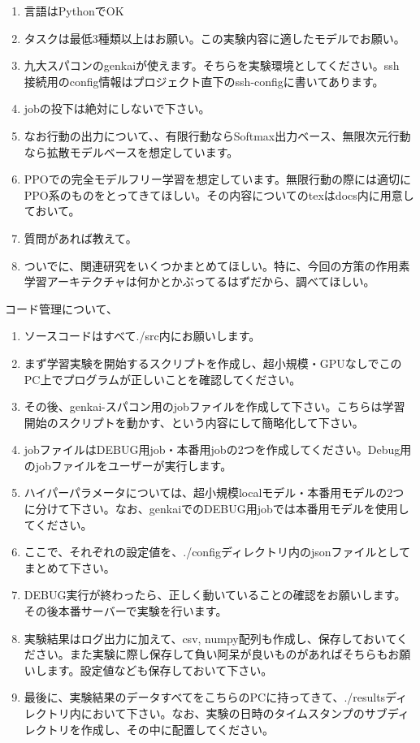 \documentclass{article}
\begin{document}
\begin{enumerate}
    \item 言語はPythonでOK
    \item タスクは最低3種類以上はお願い。この実験内容に適したモデルでお願い。
    \item 九大スパコンのgenkaiが使えます。そちらを実験環境としてください。ssh 接続用のconfig情報はプロジェクト直下のssh-configに書いてあります。
    \item jobの投下は絶対にしないで下さい。
    \item なお行動の出力について、、有限行動ならSoftmax出力ベース、無限次元行動なら拡散モデルベースを想定しています。
    \item PPOでの完全モデルフリー学習を想定しています。無限行動の際には適切にPPO系のものをとってきてほしい。その内容についてのtexはdocs内に用意しておいて。
    \item 質問があれば教えて。
    \item ついでに、関連研究をいくつかまとめてほしい。特に、今回の方策の作用素学習アーキテクチャは何かとかぶってるはずだから、調べてほしい。
\end{enumerate}

コード管理について、
\begin{enumerate}
    \item ソースコードはすべて./src内にお願いします。
    \item まず学習実験を開始するスクリプトを作成し、超小規模・GPUなしでこのPC上でプログラムが正しいことを確認してください。
    \item その後、genkai-スパコン用のjobファイルを作成して下さい。こちらは学習開始のスクリプトを動かす、という内容にして簡略化して下さい。
    \item jobファイルはDEBUG用job・本番用jobの2つを作成してください。Debug用のjobファイルをユーザーが実行します。
    \item ハイパーパラメータについては、超小規模localモデル・本番用モデルの2つに分けて下さい。なお、genkaiでのDEBUG用jobでは本番用モデルを使用してください。
    \item ここで、それぞれの設定値を、./configディレクトリ内のjsonファイルとしてまとめて下さい。
    \item DEBUG実行が終わったら、正しく動いていることの確認をお願いします。その後本番サーバーで実験を行います。
    \item 実験結果はログ出力に加えて、csv, numpy配列も作成し、保存しておいてください。また実験に際し保存して負い阿呆が良いものがあればそちらもお願いします。設定値なども保存しておいて下さい。
    \item 最後に、実験結果のデータすべてをこちらのPCに持ってきて、./resultsディレクトリ内において下さい。なお、実験の日時のタイムスタンプのサブディレクトリを作成し、その中に配置してください。
\end{enumerate}
\end{document}
